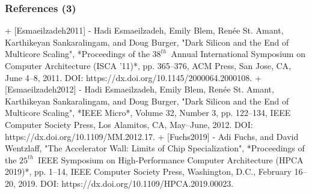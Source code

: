 \documentclass[xcolor={usenames,dvipsnames},hyperref={hyperindex,bookmarks}]{beamer}
\begin{document}
\begin{frame}
	\frametitle{References (3)}

+ [Esmaeilzadeh2011]
	- Hadi Esmaeilzadeh, Emily Blem, Ren{\'{e}}e {St. Amant}, Karthikeyan Sankaralingam, and Doug Burger, "Dark Silicon and the End of Multicore Scaling", *Proceedings of the $38^{th}$\ Annual International Symposium on Computer Architecture ({ISCA '11})*, pp. 365--376, {ACM} Press, San Jose, {CA}, June 4--8, 2011. DOI: https://dx.doi.org/10.1145/2000064.2000108.
+ [Esmaeilzadeh2012]
	- Hadi Esmaeilzadeh, Emily Blem, Ren{\'{e}}e {St. Amant}, Karthikeyan Sankaralingam, and Doug Burger, "Dark Silicon and the End of Multicore Scaling", *{IEEE} Micro*, Volume 32, Number 3, pp. 122--134, {IEEE} Computer Society Press, Los Alamitos, {CA}, May--June, 2012. DOI: https://dx.doi.org/10.1109/MM.2012.17.
+ [Fuchs2019]
	- Adi Fuchs, and David Wentzlaff, "The Accelerator Wall: Limits of Chip Specialization", *Proceedings of the $25^{th}$\ {IEEE} Symposium on High-Performance Computer Architecture ({HPCA} 2019)*, pp. 1--14, {IEEE} Computer Society Press, Washington, {D.C.}, February 16--20, 2019. DOI: https://dx.doi.org/10.1109/HPCA.2019.00023.


\end{frame}
\end{document}
